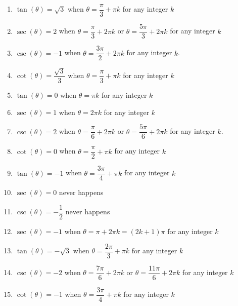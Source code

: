\documentclass{ximera}
\begin{document}
\begin{enumerate}

\setcounter{enumi}{\value{HW}}

\item $\tan(\theta) = \sqrt{3}$ when $\theta = \dfrac{\pi}{3} + \pi k$ for any integer $k$
\item $\sec(\theta) = 2$ when $\theta = \dfrac{\pi}{3} + 2\pi k$ or $\theta = \dfrac{5\pi}{3} + 2\pi k$ for any integer $k$
\item $\csc(\theta) = -1$ when $\theta = \dfrac{3\pi}{2} + 2\pi k$ for any integer $k$.
\item $\cot(\theta) = \dfrac{\sqrt{3}}{3}$ when $\theta = \dfrac{\pi}{3} + \pi k$ for any integer $k$
\item $\tan(\theta) = 0$ when $\theta = \pi k$ for any integer $k$
\item $\sec(\theta) = 1$ when $\theta = 2\pi k$ for any integer $k$
\item $\csc(\theta) = 2$ when $\theta = \dfrac{\pi}{6} + 2\pi k$ or $\theta = \dfrac{5\pi}{6} + 2\pi k$ for any integer $k$.
\item $\cot(\theta) = 0$ when $\theta = \dfrac{\pi}{2} + \pi k$ for any integer $k$
\item $\tan(\theta) = -1$ when $\theta = \dfrac{3\pi}{4} + \pi k$ for any integer $k$
\item $\sec(\theta) = 0$ never happens 
\item $\csc(\theta) = -\dfrac{1}{2}$ never happens
\item  $\sec(\theta) = -1$ when $\theta = \pi + 2\pi k = (2k+1)\pi$ for any integer $k$
\item  $\tan(\theta) = -\sqrt{3}$ when $\theta = \dfrac{2\pi}{3} + \pi k$ for any integer $k$
\item  $\csc(\theta) = -2$ when $\theta = \dfrac{7\pi}{6} + 2\pi k$ or $\theta = \dfrac{11\pi}{6} + 2\pi k$ for any integer $k$
\item  $\cot(\theta) = -1$ when $\theta = \dfrac{3\pi}{4} + \pi k$ for any integer $k$

\setcounter{HW}{\value{enumi}}

\end{enumerate}
\end{document}
